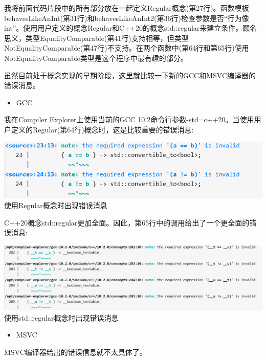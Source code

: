 我将前面代码片段中的所有部分放在一起定义Regular概念(第27行)。函数模板behavesLikeAnInt(第31行)和behavesLikeAnInt2(第36行)检查参数是否“行为像int”。使用用户定义的概念Regular和C++20的概念std::regular来建立条件。顾名思义，类型EqualityComparable(第41行)支持相等，但类型NotEqualityComparable(第47行)不支持。在两个函数中(第64行和第65行)使用NotEqualityComparable类型是这个程序中最有趣的部分。

虽然目前处于概念实现的早期阶段，这里就比较一下新的GCC和MSVC编译器的错误消息。

\begin{itemize}
\item 
GCC
\end{itemize}

我在\href{https://godbolt.org/}{Compiler Explorer}上使用当前的GCC 10.2命令行参数-std=c++20。当使用用户定义的Regular(第64行)概念时，这是比较重要的错误消息:

\begin{center}
\includegraphics[width=1.0\textwidth]{content/3/chapter4/images/1-6.png}\\
使用Regular概念时出现错误消息
\end{center}

C++20概念std::regular更加全面。因此，第65行中的调用给出了一个更全面的错误消息:

\begin{center}
\includegraphics[width=1.0\textwidth]{content/3/chapter4/images/1-7.png}\\
使用std::regular概念时出现错误消息
\end{center}

\begin{itemize}
\item 
MSVC
\end{itemize}

MSVC编译器给出的错误信息就不太具体了。

